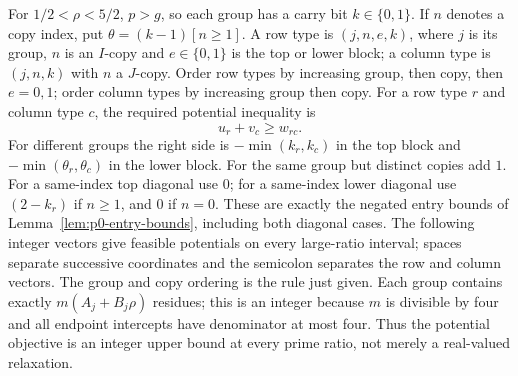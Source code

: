 For $1/2<\rho<5/2$, $p>g$, so each group has a carry bit $k\in\{0,1\}$.
If $n$ denotes a copy index, put
$\theta=(k-1)[n\ge1]$.  A row type is $(j,n,e,k)$, where $j$ is its group,
$n$ is an $I$-copy and $e\in\{0,1\}$ is the top or lower block; a column
type is $(j,n,k)$ with $n$ a $J$-copy.  Order row types by increasing group,
then copy, then $e=0,1$; order column types by increasing group then copy.
For a row type $r$ and column type $c$, the required potential inequality is
\[
 u_r+v_c\ge w_{rc}.
\]
For different groups the right side is $-\min(k_r,k_c)$ in the top block
and $-\min(\theta_r,\theta_c)$ in the lower block.  For the same group but
distinct copies add $1$.  For a same-index top diagonal use $0$; for a
same-index lower diagonal use $(2-k_r)$ if $n\ge1$, and $0$ if $n=0$.
These are exactly the negated entry bounds of
Lemma~\ref{lem:p0-entry-bounds}, including both diagonal cases.  The
following integer vectors give feasible potentials on every large-ratio
interval; spaces separate successive coordinates and the semicolon separates
the row and column vectors.  The group and copy ordering is the rule just
given.  Each group contains exactly $m(A_j+B_j\rho)$ residues; this is an
integer because $m$ is divisible by four and all endpoint intercepts have
denominator at most four.  Thus the potential objective is an integer upper
bound at every prime ratio, not merely a real-valued relaxation.

